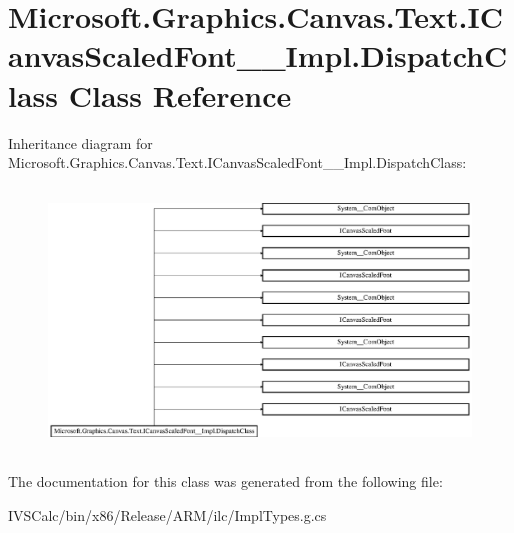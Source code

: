 \hypertarget{class_microsoft_1_1_graphics_1_1_canvas_1_1_text_1_1_i_canvas_scaled_font_____impl_1_1_dispatch_class}{}\section{Microsoft.\+Graphics.\+Canvas.\+Text.\+I\+Canvas\+Scaled\+Font\+\_\+\+\_\+\+Impl.\+Dispatch\+Class Class Reference}
\label{class_microsoft_1_1_graphics_1_1_canvas_1_1_text_1_1_i_canvas_scaled_font_____impl_1_1_dispatch_class}
Inheritance diagram for Microsoft.\+Graphics.\+Canvas.\+Text.\+I\+Canvas\+Scaled\+Font\+\_\+\+\_\+\+Impl.\+Dispatch\+Class\+:\begin{figure}[H]
\begin{center}
\leavevmode
\includegraphics[height=7.064220cm]{class_microsoft_1_1_graphics_1_1_canvas_1_1_text_1_1_i_canvas_scaled_font_____impl_1_1_dispatch_class}
\end{center}
\end{figure}


The documentation for this class was generated from the following file\+:\begin{DoxyCompactItemize}
\item 
I\+V\+S\+Calc/bin/x86/\+Release/\+A\+R\+M/ilc/Impl\+Types.\+g.\+cs\end{DoxyCompactItemize}

